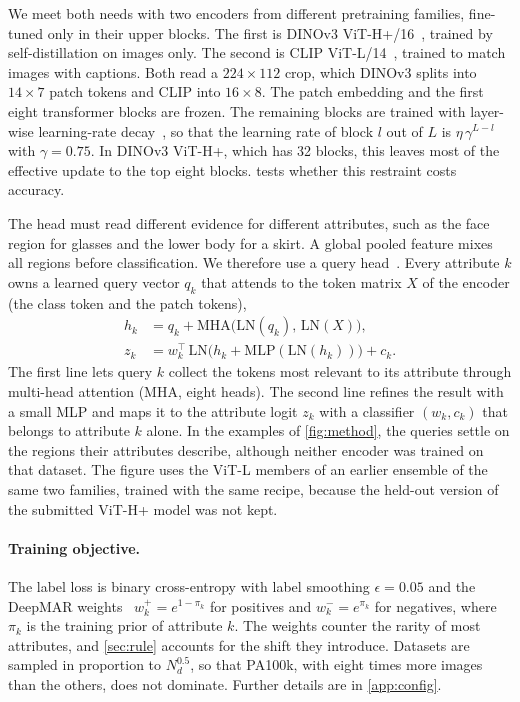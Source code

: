 \documentclass[10pt,twocolumn,letterpaper]{article}
\begin{document}
We meet both needs with two encoders from different pretraining families, fine-tuned only in their upper blocks. The first is DINOv3 ViT-H+/16~\cite{dinov3}, trained by self-distillation on images only. The second is CLIP ViT-L/14~\cite{clip}, trained to match images with captions. Both read a $224\times112$ crop, which DINOv3 splits into $14\times7$ patch tokens and CLIP into $16\times8$. The patch embedding and the first eight transformer blocks are frozen. The remaining blocks are trained with layer-wise learning-rate decay~\cite{beit}, so that the learning rate of block $l$ out of $L$ is $\eta\,\gamma^{L-l}$ with $\gamma=0.75$. In DINOv3 ViT-H+, which has 32 blocks, this leaves most of the effective update to the top eight blocks.  tests whether this restraint costs accuracy.

The head must read different evidence for different attributes, such as the face region for glasses and the lower body for a skirt. A global pooled feature mixes all regions before classification. We therefore use a query head~\cite{q2l,mldecoder}. Every attribute $k$ owns a learned query vector $q_k$ that attends to the token matrix $X$ of the encoder (the class token and the patch tokens),
\begin{align}
h_k &= q_k + \mathrm{MHA}\big(\mathrm{LN}(q_k),\,\mathrm{LN}(X)\big),\\
z_k &= w_k^{\top}\,\mathrm{LN}\big(h_k + \mathrm{MLP}(\mathrm{LN}(h_k))\big) + c_k .
\end{align}
The first line lets query $k$ collect the tokens most relevant to its attribute through multi-head attention (MHA, eight heads). The second line refines the result with a small MLP and maps it to the attribute logit $z_k$ with a classifier $(w_k,c_k)$ that belongs to attribute $k$ alone. In the examples of \cref{fig:method}, the queries settle on the regions their attributes describe, although neither encoder was trained on that dataset. The figure uses the ViT-L members of an earlier ensemble of the same two families, trained with the same recipe, because the held-out version of the submitted ViT-H+ model was not kept.

\paragraph{Training objective.} The label loss is binary cross-entropy with label smoothing $\epsilon=0.05$ and the DeepMAR weights~\cite{deepmar} $w_k^{+}=e^{1-\pi_k}$ for positives and $w_k^{-}=e^{\pi_k}$ for negatives, where $\pi_k$ is the training prior of attribute $k$. The weights counter the rarity of most attributes, and \cref{sec:rule} accounts for the shift they introduce. Datasets are sampled in proportion to $N_d^{0.5}$, so that PA100k, with eight times more images than the others, does not dominate. Further details are in \cref{app:config}.
\end{document}
